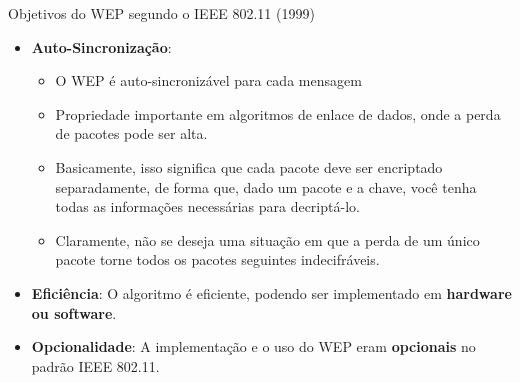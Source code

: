 \begin{frame}{Objetivos do WEP segundo o IEEE 802.11 (1999)}

    \begin{itemize}
        \item \textbf{Auto-Sincronização}:
              \begin{itemize}
                  \item O WEP é auto-sincronizável para cada mensagem
                  \item Propriedade importante em algoritmos de enlace de dados, onde a perda de pacotes pode ser alta.

                  \item Basicamente, isso significa que cada pacote deve ser encriptado separadamente, de forma que, dado um pacote e a chave, você tenha todas as informações necessárias para decriptá-lo.
                  \item Claramente, não se deseja uma situação em que a perda de um único pacote torne todos os pacotes seguintes indecifráveis.
              \end{itemize}
    \end{itemize}

    \begin{itemize}
        \item \textbf{Eficiência}:
              O algoritmo é eficiente, podendo ser implementado em \textbf{hardware ou software}.
    \end{itemize}

    \begin{itemize}
        \item \textbf{Opcionalidade}:
              A implementação e o uso do WEP eram \textbf{opcionais} no padrão IEEE 802.11.
    \end{itemize}
\end{frame}

